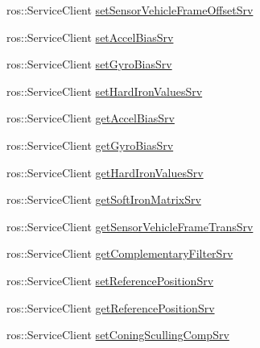 \begin{DoxyCompactItemize}
\item 
ros\+::\+Service\+Client \hyperlink{classmicrostrain__mips__client_1_1ClMicrostainMips_aa1d74713d0892154282f67b8a7724bdb}{set\+Sensor\+Vehicle\+Frame\+Offset\+Srv}
\item 
ros\+::\+Service\+Client \hyperlink{classmicrostrain__mips__client_1_1ClMicrostainMips_a95389f5732d4d8c26422c74b169b4c96}{set\+Accel\+Bias\+Srv}
\item 
ros\+::\+Service\+Client \hyperlink{classmicrostrain__mips__client_1_1ClMicrostainMips_a6b151b17844ab99c2cf5831149f4c572}{set\+Gyro\+Bias\+Srv}
\item 
ros\+::\+Service\+Client \hyperlink{classmicrostrain__mips__client_1_1ClMicrostainMips_a998f8ed1540e2170aeaf8b47b6cb6e5e}{set\+Hard\+Iron\+Values\+Srv}
\item 
ros\+::\+Service\+Client \hyperlink{classmicrostrain__mips__client_1_1ClMicrostainMips_a79b54cbc814629504707f2382d250bec}{get\+Accel\+Bias\+Srv}
\item 
ros\+::\+Service\+Client \hyperlink{classmicrostrain__mips__client_1_1ClMicrostainMips_ace4f76603ac7b3179dacee7c066c120c}{get\+Gyro\+Bias\+Srv}
\item 
ros\+::\+Service\+Client \hyperlink{classmicrostrain__mips__client_1_1ClMicrostainMips_a712c957de40a04e2b546135b6ce63921}{get\+Hard\+Iron\+Values\+Srv}
\item 
ros\+::\+Service\+Client \hyperlink{classmicrostrain__mips__client_1_1ClMicrostainMips_ad4ba8fa3476b9d63d9772aebe1295e0e}{get\+Soft\+Iron\+Matrix\+Srv}
\item 
ros\+::\+Service\+Client \hyperlink{classmicrostrain__mips__client_1_1ClMicrostainMips_a9f255bbd963a48afee1b042ef9ba3065}{get\+Sensor\+Vehicle\+Frame\+Trans\+Srv}
\item 
ros\+::\+Service\+Client \hyperlink{classmicrostrain__mips__client_1_1ClMicrostainMips_a6011cb4bf116dc0b92eff7b3409c3633}{get\+Complementary\+Filter\+Srv}
\item 
ros\+::\+Service\+Client \hyperlink{classmicrostrain__mips__client_1_1ClMicrostainMips_a9f088d1a085409bf8a952fac38e8f3d3}{set\+Reference\+Position\+Srv}
\item 
ros\+::\+Service\+Client \hyperlink{classmicrostrain__mips__client_1_1ClMicrostainMips_a9bf74f33ad09f1159a1b2a91e34df8e9}{get\+Reference\+Position\+Srv}
\item 
ros\+::\+Service\+Client \hyperlink{classmicrostrain__mips__client_1_1ClMicrostainMips_a4673167297fb4266bc2f2bcfa8d5af13}{set\+Coning\+Sculling\+Comp\+Srv}
\item 

\end{DoxyCompactItemize}

